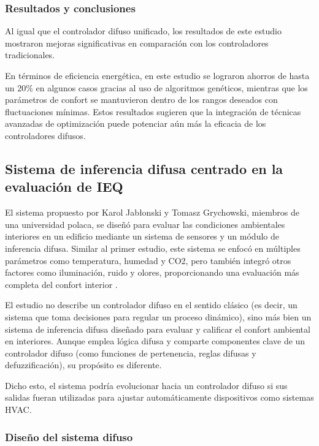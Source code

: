 \subsubsection{Resultados y conclusiones}

Al igual que el controlador difuso unificado, los resultados de este estudio mostraron mejoras significativas en comparación con los controladores tradicionales.

En términos de eficiencia energética, en este estudio se lograron ahorros de hasta un 20\% en algunos casos gracias al uso de algoritmos genéticos, mientras que los parámetros de confort se mantuvieron dentro de los rangos deseados con fluctuaciones mínimas. Estos resultados sugieren que la integración de técnicas avanzadas de optimización puede potenciar aún más la eficacia de los controladores difusos.

\subsection{Sistema de inferencia difusa centrado en la evaluación de IEQ}

El sistema propuesto por Karol Jabłonski y Tomasz Grychowski, miembros de una universidad polaca, se diseñó para evaluar las condiciones ambientales interiores en un edificio mediante un sistema de sensores y un módulo de inferencia difusa. Similar al primer estudio, este sistema se enfocó en múltiples parámetros como temperatura, humedad y CO2, pero también integró otros factores como iluminación, ruido y olores, proporcionando una evaluación más completa del confort interior \parencite{jablonski2018fuzzy}.

El estudio no describe un controlador difuso en el sentido clásico (es decir, un sistema que toma decisiones para regular un proceso dinámico), sino más bien un sistema de inferencia difusa diseñado para evaluar y calificar el confort ambiental en interiores. Aunque emplea lógica difusa y comparte componentes clave de un controlador difuso (como funciones de pertenencia, reglas difusas y defuzzificación), su propósito es diferente.

Dicho esto, el sistema podría evolucionar hacia un controlador difuso si sus salidas fueran utilizadas para ajustar automáticamente dispositivos como sistemas HVAC.

\subsubsection{Diseño del sistema difuso}


